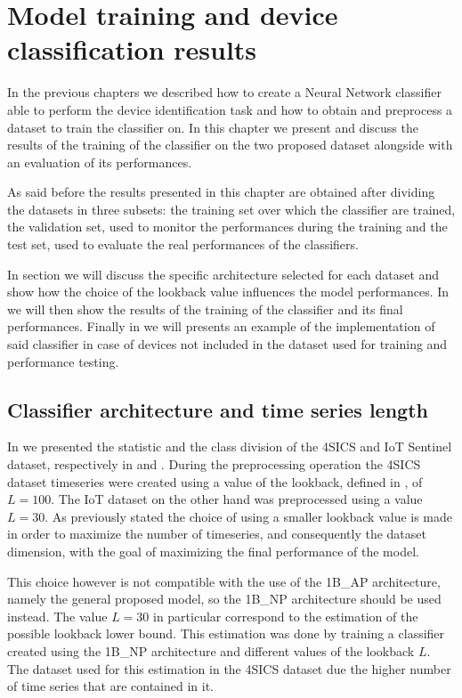 \chapter{Model training and device classification results} \label{chap6}

In the previous chapters we described how to create a Neural Network classifier able to perform the device identification task and how to obtain and preprocess a dataset to train the classifier on. In this chapter we present and discuss the results of the training of the classifier on the two proposed dataset alongside with an evaluation of its performances.

As said before the results presented in this chapter are obtained after dividing the datasets in three subsets: the training set over which the classifier are trained, the validation set, used to monitor the performances during the training and the test set, used to evaluate the real performances of the classifiers.

In section  we will discuss the specific architecture selected for each dataset and show how the choice of the lookback value influences the model performances. In  we will then show the results of the training of the classifier and its final performances. Finally in  we will presents an example of the implementation of said classifier in case of devices not included in the dataset used for training and performance testing.

\section{Classifier architecture and time series length}\label{res_lb}

In  we presented the statistic and the class division of the 4SICS and IoT Sentinel dataset, respectively in  and . During the preprocessing operation the 4SICS dataset timeseries were created using a value of the lookback, defined in , of $L=100$. The IoT dataset on the other hand was preprocessed using a value $L=30$. As previously stated the choice of using a smaller lookback value is made in order to maximize the number of timeseries, and consequently the dataset dimension, with the goal of maximizing the final performance of the model. 

This choice however is not compatible with the use of the 1B\_AP architecture, namely the general proposed model, so the 1B\_NP architecture should be used instead. The value $L=30$ in particular correspond to the estimation of the possible lookback lower bound. This estimation was done by training a classifier created using the 1B\_NP architecture and different values of the lookback $L$. The dataset used for this estimation in the 4SICS dataset due the higher number of time series that are contained in it. 

